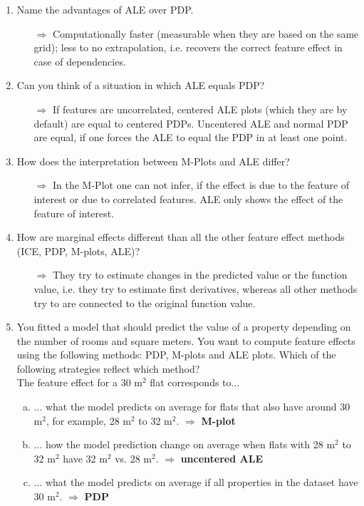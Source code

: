 \begin{enumerate}
\begin{itemize}
\begin{itemize}
        \end{itemize}
    \end{itemize}
    \item Name the advantages of ALE over PDP.
    \begin{itemize}
        \item[$\Rightarrow$] Computationally faster (measurable when they are based on the same grid); less to no extrapolation, i.e. recovers the correct feature effect in case of dependencies.
    \end{itemize}
    \item Can you think of a situation in which ALE equals PDP?
    \begin{itemize}
        \item[$\Rightarrow$] If features are uncorrelated, centered ALE plots (which they are by default) are equal to centered PDPs.
        Uncentered ALE and normal PDP are equal, if one forces the ALE to equal the PDP in at least one point.
    \end{itemize}
    \item How does the interpretation between M-Plots and ALE differ?
    \begin{itemize}
        \item[$\Rightarrow$] In the M-Plot one can not infer, if the effect is due to the feature of interest or due to correlated features. ALE only shows the effect of the feature of interest.
    \end{itemize}
    \item How are marginal effects different than all the other feature effect methods (ICE, PDP, M-plots, ALE)?
    \begin{itemize}
        \item[$\Rightarrow$] They try to estimate changes in the predicted value or the function value, i.e. they try to estimate first derivatives, whereas all other methods try to are connected to the original function value.
    \end{itemize}



    \item
    You fitted a model that should predict the value of a property depending on the number of rooms and square meters.
    You want to compute feature effects using the following methods: PDP, M-plots and ALE plots. 
    Which of the following strategies reflect which method? \\
    The feature effect for a 30 m$^2$ flat corresponds to... 
    \begin{enumerate}[a)]
        \item ... what the model predicts on average for flats that also have around 30 m$^2$, for example, 28 m$^2$ to 32 m$^2$. $\Rightarrow$ \textbf{M-plot}
        \item ... how the model prediction change on average when flats with 28 m$^2$ to 32 m$^2$ have 32 m$^2$ vs. 28 m$^2$. $\Rightarrow$ \textbf{uncentered ALE}
        \item ... what the model predicts on average if all properties in the dataset have 30 m$^2$. $\Rightarrow$ \textbf{PDP}
    \end{enumerate}

\end{enumerate}
